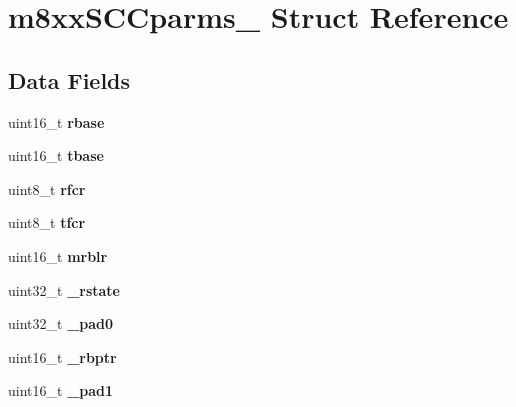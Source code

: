 \hypertarget{structm8xxSCCparms__}{}\section{m8xx\+S\+C\+Cparms\+\_\+ Struct Reference}
\label{structm8xxSCCparms__}
\subsection*{Data Fields}
\begin{DoxyCompactItemize}
\item 
\mbox{\label{structm8xxSCCparms___a85843b6f61d47d92200a936a3032a8ab}} 
uint16\+\_\+t {\bfseries rbase}
\item 
\mbox{\label{structm8xxSCCparms___abbd4c09c4913d8569d8b2ac6a5f7bfb5}} 
uint16\+\_\+t {\bfseries tbase}
\item 
\mbox{\label{structm8xxSCCparms___a0bc6bfccd962ab600a8e35e6f28daa0a}} 
uint8\+\_\+t {\bfseries rfcr}
\item 
\mbox{\label{structm8xxSCCparms___ae03f32c63a6e0e50be178771dcab9c00}} 
uint8\+\_\+t {\bfseries tfcr}
\item 
\mbox{\label{structm8xxSCCparms___a995e79025f80794720d9d3c1d3217b61}} 
uint16\+\_\+t {\bfseries mrblr}
\item 
\mbox{\label{structm8xxSCCparms___ada259147504d81550d440cc71cc59d28}} 
uint32\+\_\+t {\bfseries \+\_\+rstate}
\item 
\mbox{\label{structm8xxSCCparms___ad91fa7bbb9bd2b0423bff0be67fc4153}} 
uint32\+\_\+t {\bfseries \+\_\+pad0}
\item 
\mbox{\label{structm8xxSCCparms___a7b0065209bc3ce89e6cba04e382e7268}} 
uint16\+\_\+t {\bfseries \+\_\+rbptr}
\item 
\mbox{\label{structm8xxSCCparms___a1cffdbf12f0a30b89ff89ed82ea030c0}} 
uint16\+\_\+t {\bfseries \+\_\+pad1}
\item 
\mbox{\label{structm8xxSCCparms___a00548dea00f32ecf36e044da2a900a33}} 

\end{DoxyCompactItemize}

